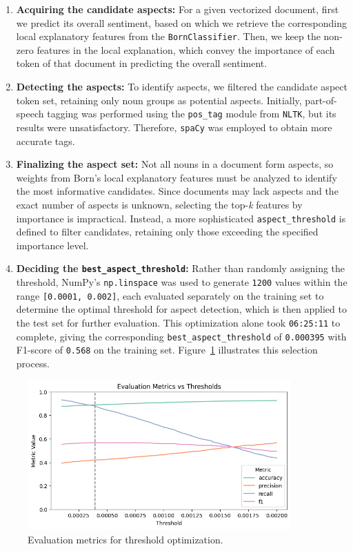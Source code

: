 \begin{enumerate}
    \item \textbf{Acquiring the candidate aspects:} For a given vectorized document, first we predict its overall sentiment, based on which we retrieve the corresponding local explanatory features from the \texttt{BornClassifier}. Then, we keep the non-zero features in the local explanation, which convey the importance of each token of that document in predicting the overall sentiment.

    \item \textbf{Detecting the aspects:} To identify aspects, we filtered the candidate aspect token set, retaining only noun groups as potential aspects. Initially, part-of-speech tagging was performed using the \texttt{pos\_tag} module from \texttt{NLTK}, but its results were unsatisfactory. Therefore, \texttt{spaCy} was employed to obtain more accurate tags.

    \item \textbf{Finalizing the aspect set:} Not all nouns in a document form aspects, so weights from Born's local explanatory features must be analyzed to identify the most informative candidates. Since documents may lack aspects and the exact number of aspects is unknown, selecting the top-\textit{k} features by importance is impractical. Instead, a more sophisticated \texttt{aspect\_threshold} is defined to filter candidates, retaining only those exceeding the specified importance level.

    \item \textbf{Deciding the \texttt{best\_aspect\_threshold}:} Rather than randomly assigning the threshold, NumPy's \texttt{np.linspace} was used to generate \texttt{1200} values within the range \texttt{[0.0001, 0.002]}, each evaluated separately on the training set to determine the optimal threshold for aspect detection, which is then applied to the test set for further evaluation. This optimization alone took \texttt{06:25:11} to complete, giving the corresponding \texttt{best\_aspect\_threshold} of \texttt{0.000395} with F1-score of \texttt{0.568} on the training set. Figure~\ref{fig:threshold_optimization} illustrates this selection process.
\end{enumerate}

\begin{figure}[h]
\centering
\includegraphics[width=0.9\textwidth]{images/threshold_optimization.png}
\caption{Evaluation metrics for threshold optimization.}\label{fig:threshold_optimization}
\end{figure}

